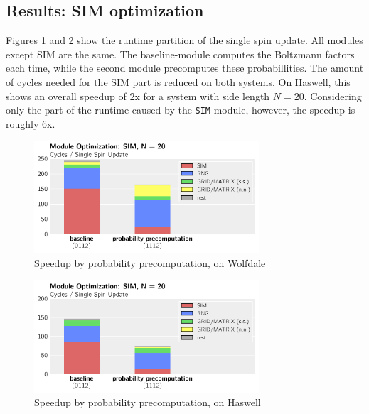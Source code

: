\documentclass[letterpaper]{article}
\begin{document}
\subsection{Results: SIM optimization} \label{res:SIM}
Figures \ref{SIM:Wolf:20} and \ref{SIM:Has:20} show the runtime partition of the single spin update. All modules except SIM are the same. The baseline-module computes the Boltzmann factors each time, while the second module precomputes these probabillities. The amount of cycles needed for the SIM part is reduced on both systems. On Haswell, this shows an overall speedup of $2$x for a system with side length $N = 20$. Considering only the part of the runtime caused by the \texttt{SIM} module, however, the speedup is roughly $6$x.
	\begin{figure}[H]\centering
	  \includegraphics[width = 8.36cm]{plots/msk_20_2.pdf}
	  \caption{Speedup by probability precomputation, on Wolfdale}
	  \label{SIM:Wolf:20}
	\end{figure}
	\begin{figure}[h]\centering
	  \includegraphics[width = 8.36cm]{plots/dg_20_2.pdf}
	  \caption{Speedup by probability precomputation, on Haswell}
	  \label{SIM:Has:20}
	\end{figure}
\end{document}

